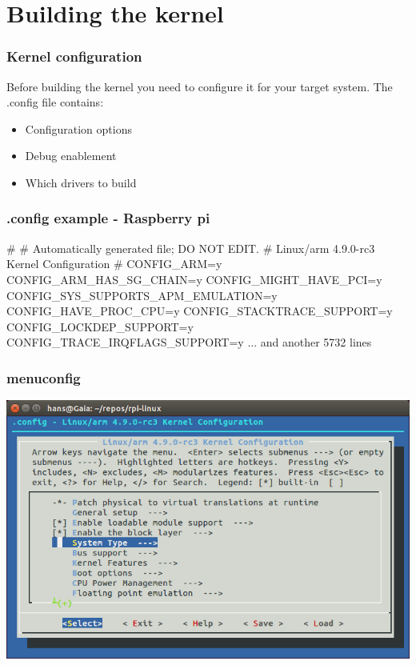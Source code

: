 \documentclass{beamer}
\begin{document}
\section{Building the kernel}

\begin{frame}
\frametitle{Kernel configuration}
Before building the kernel you need to configure it for your target system.
The .config file contains:
\begin{itemize}
	\item Configuration options
	\item Debug enablement
	\item Which drivers to build
\end{itemize}
\end{frame}

\begin{frame}[fragile]
\frametitle{.config example - Raspberry pi}
\begin{semiverbatim}
#
# Automatically generated file; DO NOT EDIT.
# Linux/arm 4.9.0-rc3 Kernel Configuration
#
CONFIG_ARM=y
CONFIG_ARM_HAS_SG_CHAIN=y
CONFIG_MIGHT_HAVE_PCI=y
CONFIG_SYS_SUPPORTS_APM_EMULATION=y
CONFIG_HAVE_PROC_CPU=y
CONFIG_STACKTRACE_SUPPORT=y
CONFIG_LOCKDEP_SUPPORT=y
CONFIG_TRACE_IRQFLAGS_SUPPORT=y
... and another 5732 lines
\end{semiverbatim}
\end{frame}

\begin{frame}
\frametitle{menuconfig}
\includegraphics[width=\textwidth]{menuconfig.png}
\end{frame}
\end{document}
